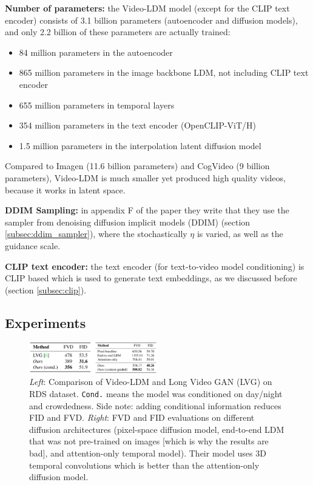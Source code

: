 \textbf{Number of parameters: } the Video-LDM model (except for the CLIP text encoder) consists of 3.1 billion parameters (autoencoder and diffusion models), and only 2.2 billion of these parameters are actually trained:

\begin{itemize}
    \item 84 million parameters in the autoencoder
    \item 865 million parameters in the image backbone LDM, not including CLIP text encoder
    \item 655 million parameters in temporal layers
    \item 354 million parameters in the text encoder (OpenCLIP-ViT/H)
    \item 1.5 million parameters in the interpolation latent diffusion model
\end{itemize}

Compared to Imagen (11.6 billion parameters) and CogVideo (9 billion parameters), Video-LDM is much smaller yet produced high quality videos, because it works in latent space.

\textbf{DDIM Sampling:} in appendix F of the paper they write that they use the sampler from denoising diffusion implicit models (DDIM) \cite{ddim} (section \ref{subsec:ddim_sampler}), where the stochastically $\eta$ is varied, as well as the guidance scale.

\textbf{CLIP text encoder: } the text encoder (for text-to-video model conditioning) is CLIP \cite{openai_clip} based which is used to generate text embeddings, as we discussed before (section \ref{subsec:clip}).










\subsection{Experiments}

\begin{figure}
    \centering
    \includegraphics[width=0.5\textwidth]{images/video_ldm/videoldm_vs_lvg_on_rds.png}
    \caption{\textit{Left}: Comparison of Video-LDM and Long Video GAN (LVG) on RDS dataset. \texttt{Cond.} means the model was conditioned on day/night and crowdedness. Side note: adding conditional information reduces FID and FVD. \textit{Right}: FVD and FID evaluations on different diffusion architectures (pixel-space diffusion model, end-to-end LDM that was not pre-trained on images [which is why the results are bad], and attention-only temporal model). Their model uses 3D temporal convolutions which is better than the attention-only diffusion model.}
    \label{fig:video_ldm_vs_lvg_on_rds}
\end{figure}

